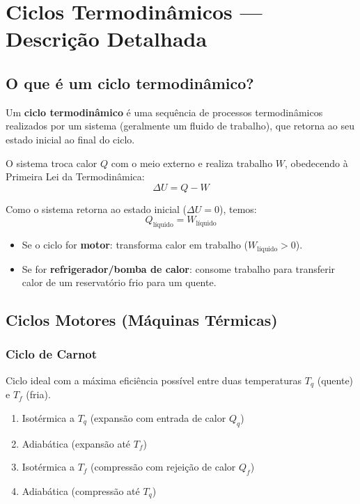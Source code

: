 \section*{Ciclos Termodinâmicos — Descrição Detalhada}

\subsection*{O que é um ciclo termodinâmico?}

Um \colorbox{yellow!40}{\textbf{ciclo termodinâmico} é uma sequência de processos termodinâmicos} realizados por um sistema (geralmente um fluido de trabalho), que retorna ao seu estado inicial ao final do ciclo.

O sistema troca calor \(Q\) com o meio externo e realiza trabalho \(W\), obedecendo à Primeira Lei da Termodinâmica:
\[
\Delta U = Q - W
\]

Como o \colorbox{yellow!40}{sistema retorna ao estado inicial (\(\Delta U = 0\))}, temos:
\[
Q_{\text{líquido}} = W_{\text{líquido}}
\]

\begin{itemize}
  \item Se \colorbox{yellow!40}{o ciclo for \textbf{motor}: transforma calor em trabalho (\(W_{\text{líquido}} > 0\)).}
  \item Se for \textbf{refrigerador/bomba de calor}: consome trabalho para transferir calor de um reservatório frio para um quente.
\end{itemize}

\subsection*{Ciclos Motores (Máquinas Térmicas)}

\subsubsection*{\colorbox{yellow!40}{Ciclo de Carnot}}

Ciclo ideal com a máxima eficiência possível entre duas temperaturas \(T_q\) (quente) e \(T_f\) (fria).

\begin{enumerate}
  \item \colorbox{green!30}{Isotérmica a \(T_q\) (expansão com entrada de calor \(Q_q\))}
  \item \colorbox{green!30}{Adiabática (expansão até \(T_f\))}
  \item \colorbox{green!30}{Isotérmica a \(T_f\) (compressão com rejeição de calor \(Q_f\))}
  \item \colorbox{green!30}{Adiabática (compressão até \(T_q\))}
\end{enumerate}

